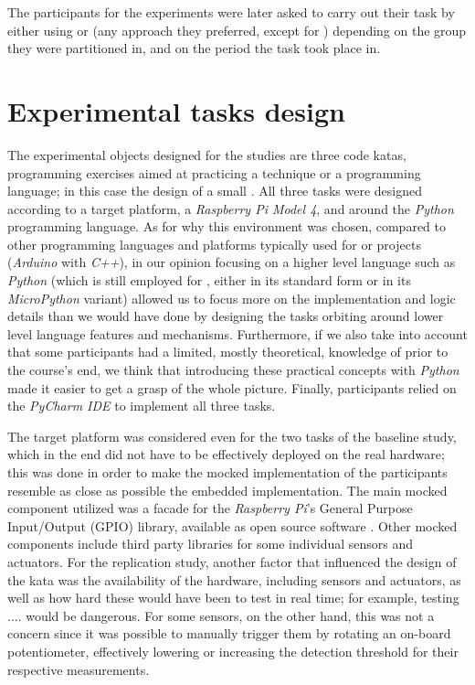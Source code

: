 The participants for the experiments were later asked to carry out their task by either using \tdd or \notdd (\ie any approach they preferred, except for \tdd) depending on the group they were partitioned in, and on the period the task took place in. 





\section{Experimental tasks design}
The experimental objects designed for the studies are three code katas, \ie programming exercises aimed at practicing a technique or a programming language; in this case the design of a small \es. All three tasks were designed according to a target platform, a \textit{Raspberry Pi Model 4}, and around the \textit{Python} programming language. As for why this environment was chosen, compared to other programming languages and platforms typically used for \es or \iot projects (\eg \textit{Arduino} with \textit{C++}), in our opinion focusing on a higher level language such as \textit{Python} (which is still employed for \ess, either in its standard form or in its \textit{MicroPython} variant) allowed us to focus more on the implementation and logic details than we would have done by designing the tasks orbiting around lower level language features and mechanisms.
Furthermore, if we also take into account that some participants had a limited, mostly theoretical, knowledge of \ess prior to the course's end, we think that introducing these practical concepts with \textit{Python} made it easier to get a grasp of the whole picture. Finally, participants relied on the \textit{PyCharm IDE} to implement all three tasks.

The target platform was considered even for the two tasks of the baseline study, which in the end did not have to be effectively deployed on the real hardware; this was done in order to make the mocked implementation of the participants resemble as close as possible the embedded implementation. The main mocked component utilized was a facade for the \textit{Raspberry Pi}'s General Purpose Input/Output (GPIO) library, available as open source software \cite{GPIOMock}. Other mocked components include third party libraries for some individual sensors and actuators.
For the replication study, another factor that influenced the design of the kata was the availability of the hardware, including sensors and actuators, as well as how hard these would have been to test in real time; for example, testing .... would be dangerous.
For some sensors, on the other hand, this was not a concern since it was possible to manually trigger them by rotating an on-board potentiometer, effectively lowering or increasing the detection threshold for their respective measurements.


